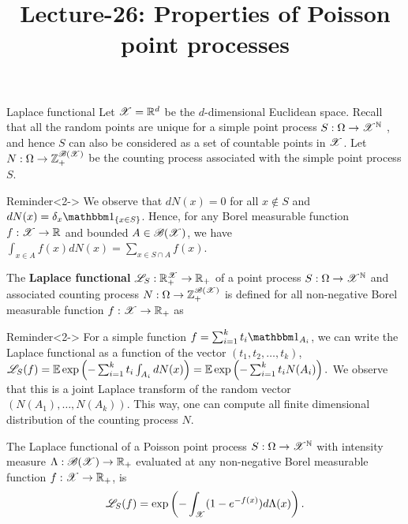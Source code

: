 \documentclass[12pt,aspectratio=169]{beamer}
\title{Lecture-26: Properties of Poisson point processes}
\date{}
\begin{document}
\pagestyle{empty}
\maketitle


\begin{frame}{Laplace functional}
Let $\mathscr{X} = \mathbb{R}^d$ be the $d$-dimensional Euclidean space. 
Recall that all the random points are unique for a simple point process $S:\Omega\to\mathscr{X}^{\mathbb{N}}$ , 
and hence $S$ can also be considered as a set of countable points in $\mathscr{X}$. 
Let $N:\Omega\to\mathbb{Z}_+^{\mathscr{B}(\mathscr{X})}$ be the counting process associated with the simple point process $S$. 
\begin{block}{Reminder}<2->
We observe that $dN(x) = 0$ for all $x \notin S$ and $dN(x) = \delta_x\SetIn{x \in S}$.  
Hence, for any Borel measurable function $f : \mathscr{X} \to \mathbb{R}$ and bounded $A \in \mathscr{B}(\mathscr{X})$, we have
$
\int_{x \in A}f(x)dN(x) = \sum_{x \in S\cap A}f(x). %
$
\end{block}
\end{frame}

\begin{frame}
\begin{Definition}
The \textbf{Laplace functional} $\mathscr{L}_S: \mathbb{R}_+^{\mathscr{X}}\to\mathbb{R}_+$ of a point process $S:\Omega\to\mathscr{X}^{\mathbb{N}}$ and associated counting process $N:\Omega\to\mathbb{Z}_+^{\mathscr{B}(\mathscr{X})}$ is defined for all non-negative Borel measurable function $f: \mathscr{X} \to \mathbb{R}_+$ as 
\end{Definition}
\begin{block}{Reminder}<2->
For a simple function $f = \sum_{i = 1}^{k}t_i\Ind{A_i}$, we can write the Laplace functional as a function of the vector $(t_1, t_2, \dots, t_k)$, 
$
\mathscr{L}_{S}(f) = \mathbb{E}\exp\left(-\sum_{i=1}^kt_i\int_{A_i}dN(x)\right) = \mathbb{E}\exp\left(-\sum_{i=1}^kt_iN(A_i)\right).
$
We observe that this is a joint Laplace transform of the random vector $(N(A_1), \dots, N(A_k))$. 
This way, one can compute all finite dimensional distribution of the counting process $N$. 
\end{block}
\end{frame}

\begin{frame}
\begin{prop}
The Laplace functional of a Poisson point process $S:\Omega\to\mathscr{X}^{\mathbb{N}}$ with intensity measure $\Lambda:\mathscr{B}(\mathscr{X})\to\mathbb{R}_+$ evaluated at any non-negative Borel measurable function $f:\mathscr{X}\to\mathbb{R}_+$, 
is 
\begin{equation*}
\mathscr{L}_{S}(f) = \exp\left(-\int_{\mathscr{X}}(1-e^{-f(x)})d\Lambda(x)\right).
\end{equation*}  
\end{prop}
\end{frame}
\end{document}
